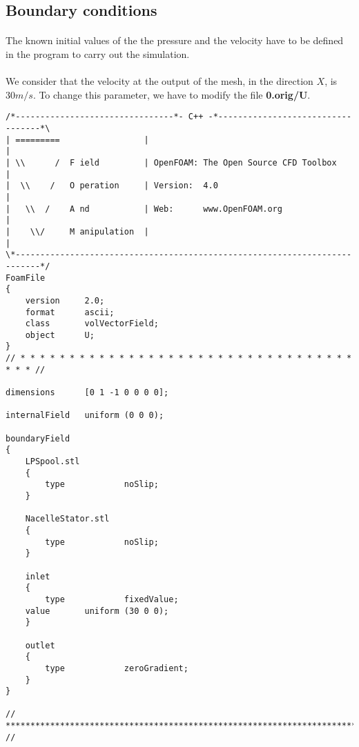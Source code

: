 \subsection{Boundary conditions}
\paragraph{}
The known initial values of the the pressure and the velocity have to be defined in the program to carry out the simulation.

\paragraph{}
We consider that the velocity at the output of the mesh, in the direction $X$, is $30 m/s$. To change this parameter, we have to modify the file \textbf{0.orig/U}.


\begin{footnotesize}

\begin{verbatim}
/*--------------------------------*- C++ -*----------------------------------*\
| =========                 |                                                 |
| \\      /  F ield         | OpenFOAM: The Open Source CFD Toolbox           |
|  \\    /   O peration     | Version:  4.0                                   |
|   \\  /    A nd           | Web:      www.OpenFOAM.org                      |
|    \\/     M anipulation  |                                                 |
\*---------------------------------------------------------------------------*/
FoamFile
{
    version     2.0;
    format      ascii;
    class       volVectorField;
    object      U;
}
// * * * * * * * * * * * * * * * * * * * * * * * * * * * * * * * * * * * * * //

dimensions      [0 1 -1 0 0 0 0];

internalField   uniform (0 0 0);

boundaryField
{
    LPSpool.stl
    {
        type            noSlip;
    }

    NacelleStator.stl
    {
        type            noSlip;
    }

    inlet
    {
        type            fixedValue;
	value		uniform (30 0 0);
    }

    outlet
    {
        type            zeroGradient;
    }
}

// ************************************************************************* //

\end{verbatim}

\end{footnotesize}

